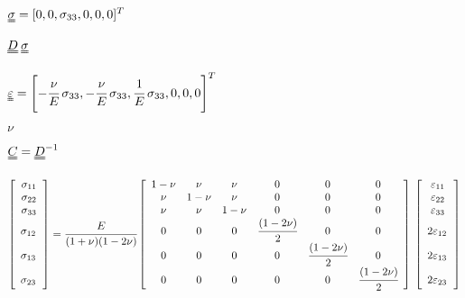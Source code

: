 \documentclass[onecolumn,11pt]{report}
\def\lthtmlcheckvsize{\ifdim\ht\sizebox<\vsize 
  \ifdim\wd\sizebox<\hsize\expandafter\hfill\fi \expandafter\vfill
  \else\expandafter\vss\fi}%
\begin{document}
{\newpage\clearpage
{}%
$ \uuline{\sigma} = [0,0,\sigma_{33},0,0,0]^T$%
\lthtmlindisplaymathZ
\lthtmlcheckvsize\clearpage}

{\newpage\clearpage
{}%
$ \uuline{D} \: \uuline{\sigma}$%
\lthtmlindisplaymathZ
\lthtmlcheckvsize\clearpage}

{\newpage\clearpage
{}%
$\displaystyle \uuline{\varepsilon} = \left [ -\cfrac{\nu}{E} \: \sigma_{33},-\cfrac{\nu}{E} \: \sigma_{33},\cfrac{1}{E} \: \sigma_{33},0,0,0 \right]^T $%
\lthtmlindisplaymathZ
\lthtmlcheckvsize\clearpage}

{\newpage\clearpage
{}%
$ \nu$%
\lthtmlindisplaymathZ
\lthtmlcheckvsize\clearpage}

{\newpage\clearpage
{}%
$ \uuline{C} = \uuline{D}^{-1}$%
\lthtmlindisplaymathZ
\lthtmlcheckvsize\clearpage}

{\newpage\clearpage
{}%
\begin{displaymath}%
	\left[
\begin{array} {c}
\sigma_{11} \\
\sigma_{22} \\
\sigma_{33} \\
\sigma_{12} \cfrac{}{} \\
\sigma_{13} \cfrac{}{} \\
\sigma_{23} \cfrac{}{}
\end{array}
\right]
= \cfrac{E}{(1+\nu)(1-2\nu)}
\left[
\begin{array}{cccccc}
1-\nu & \nu & \nu & 0 & 0 & 0\\
\nu & 1-\nu & \nu & 0 & 0 & 0\\
\nu & \nu & 1-\nu & 0 & 0 & 0\\
0 & 0 & 0 & \cfrac{(1-2\nu)}{2} & 0 & 0 \\
0 & 0 & 0 & 0 & \cfrac{(1-2\nu)}{2} & 0 \\
0 & 0 & 0 & 0 & 0 & \cfrac{(1-2\nu)}{2}
\end{array}
\right]
\:
\left[
\begin{array} {c}
\varepsilon_{11} \\
\varepsilon_{22} \\
\varepsilon_{33} \\
2 \varepsilon_{12} \cfrac{}{} \\
2 \varepsilon_{13}  \cfrac{}{}\\
2 \varepsilon_{23} \cfrac{}{}
\end{array}
\right]\end{displaymath}%
\lthtmldisplayZ
\lthtmlcheckvsize\clearpage}
\end{document}
